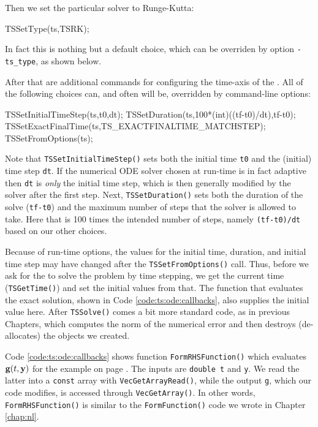 Then we set the particular \pTS solver to Runge-Kutta:
\begin{code}
  TSSetType(ts,TSRK);
\end{code}
In fact this is nothing but a default choice, which can be overriden by option \texttt{-ts\_type}, as shown below.

After that are additional commands for configuring the time-axis of the \pTS.  All of the following choices can, and often will be, overridden by command-line options:
\begin{code}
  TSSetInitialTimeStep(ts,t0,dt);
  TSSetDuration(ts,100*(int)((tf-t0)/dt),tf-t0);
  TSSetExactFinalTime(ts,TS_EXACTFINALTIME_MATCHSTEP);
  TSSetFromOptions(ts);
\end{code}
Note that \texttt{TSSetInitialTimeStep()} sets both the initial time \texttt{t0} and the (initial) time step \texttt{dt}.  If the numerical ODE solver chosen at run-time is in fact adaptive then \texttt{dt} is \emph{only} the initial time step, which is then generally modified by the solver after the first step.  Next, \texttt{TSSetDuration()} sets both the duration of the solve (\texttt{tf-t0}) and the maximum number of steps that the solver is allowed to take.  Here that is 100 times the intended number of steps, namely \texttt{(tf-t0)/dt} based on our other choices.

Because of run-time options, the values for the initial time, duration, and initial time step may have changed after the \texttt{TSSetFromOptions()} call.  Thus, before we ask for the \pTS to solve the problem by time stepping, we get the current time (\texttt{TSGetTime()}) and set the initial values from that.  The function that evaluates the exact solution, shown in Code \ref{code:ts:ode:callbacks}, also supplies the initial value here.  After \texttt{TSSolve()} comes a bit more standard code, as in previous Chapters, which computes the norm of the numerical error and then destroys (de-allocates) the objects we created.

Code \ref{code:ts:ode:callbacks} shows function \texttt{FormRHSFunction()} which evaluates $\mathbf{g}(t,\mathbf{y})$ for the example on page \pageref{ex:ts:odeeasy}.  The inputs are \texttt{double t} and \pVec \texttt{y}.  We read the latter into a \texttt{const} array with \texttt{VecGetArrayRead()}, while the output \pVec \texttt{g}, which our code modifies, is accessed through \texttt{VecGetArray()}.  In other words, \texttt{FormRHSFunction()} is similar to the \texttt{FormFunction()} code we wrote in Chapter \ref{chap:nl}.

